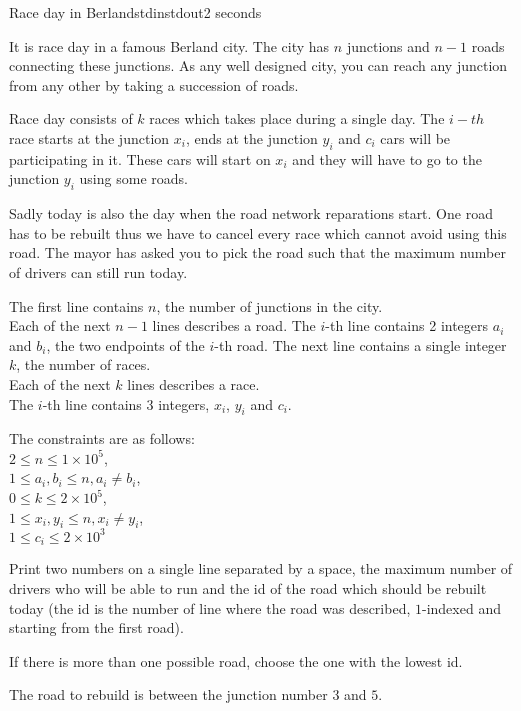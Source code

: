 \begin{problem}{Race day in Berland}{stdin}{stdout}{2 seconds}



It is race day in a famous Berland city. 
The city has $n$ junctions and $n-1$ roads connecting these junctions. 
As any well designed city, you can reach any junction from any other by taking a succession of roads. 

Race day consists of $k$ races which takes place during a single day. The $i-th$ race starts at the junction $x_i$, ends at the junction $y_i$ and $c_i$ cars will be participating in it. These cars will start on $x_i$ and they will have to go to the junction $y_i$ using some roads. 


Sadly today is also the day when the road network reparations start. One road has to be rebuilt thus we have to cancel every race which cannot avoid using this road. 
The mayor has asked you to pick the road such that the maximum number of drivers can still run today.

\InputFile

The first line contains $n$, the number of junctions in the city.\\ 
Each of the next $n-1$ lines describes a road.
The $i$-th line contains 2 integers $a_i$ and $b_i$, the two endpoints of the $i$-th road.
The next line contains a single integer $k$, the number of races.\\ 
Each of the next $k$ lines describes a race.\\ 
The $i$-th line contains 3 integers, $x_i$, $y_i$ and $c_i$.

The constraints are as follows:\\ 
$2\le n \le 1\times 10^5$,\\ 
$1\le a_i,b_i\le n, a_i\not = b_i$,\\ 
$0\le k \le 2\times 10^5$,\\ 
$1\le x_i,y_i\le n, x_i\not = y_i$,\\ 
$1\le c_i \le 2\times 10^3$ 


\OutputFile
Print two numbers on a single line separated by a space, the maximum number of drivers who will be able to run and the id of the road which should be rebuilt today (the id is the number of line where the road was described, $1$-indexed and starting from the first road).

If there is more than one possible road, choose the one with the lowest id.

\Example

\begin{examplewide}
%
\end{examplewide}

The road to rebuild is between the junction number $3$ and $5$.

\end{problem}
